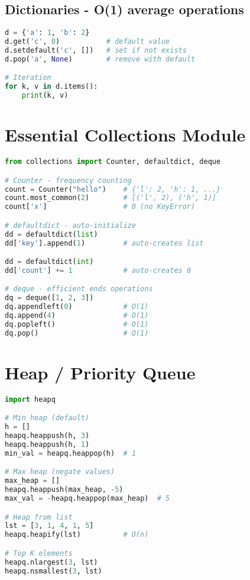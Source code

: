 \documentclass[9pt,a4paper]{article}
\begin{document}
\begin{multicols}{2}
\subsection*{Dictionaries - O(1) average operations}
\begin{lstlisting}[language=Python]
d = {'a': 1, 'b': 2}
d.get('c', 0)           # default value
d.setdefault('c', [])   # set if not exists
d.pop('a', None)        # remove with default

# Iteration
for k, v in d.items():
    print(k, v)
\end{lstlisting}

\section*{Essential Collections Module}
\begin{lstlisting}[language=Python]
from collections import Counter, defaultdict, deque

# Counter - frequency counting
count = Counter("hello")    # {'l': 2, 'h': 1, ...}
count.most_common(2)        # [('l', 2), ('h', 1)]
count['x']                  # 0 (no KeyError)

# defaultdict - auto-initialize
dd = defaultdict(list)
dd['key'].append(1)         # auto-creates list

dd = defaultdict(int)
dd['count'] += 1            # auto-creates 0

# deque - efficient ends operations
dq = deque([1, 2, 3])
dq.appendleft(0)            # O(1)
dq.append(4)                # O(1)
dq.popleft()                # O(1)
dq.pop()                    # O(1)
\end{lstlisting}

\section*{Heap / Priority Queue}
\begin{lstlisting}[language=Python]
import heapq

# Min heap (default)
h = []
heapq.heappush(h, 3)
heapq.heappush(h, 1)
min_val = heapq.heappop(h)  # 1

# Max heap (negate values)
max_heap = []
heapq.heappush(max_heap, -5)
max_val = -heapq.heappop(max_heap)  # 5

# Heap from list
lst = [3, 1, 4, 1, 5]
heapq.heapify(lst)          # O(n)

# Top K elements
heapq.nlargest(3, lst)
heapq.nsmallest(3, lst)
\end{lstlisting}


\end{multicols}
\end{document}
